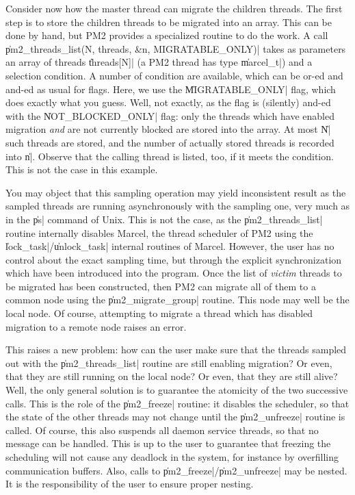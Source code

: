 Consider now how the master thread can migrate the children threads.
The first step is to store the children threads to be migrated into an
array.  This can be done by hand, but PM2 provides a specialized
routine to do the work. A call \|pm2_threads_list(N, threads, &n,
MIGRATABLE_ONLY)| takes as parameters an array of threads
\|threads[N]| (a PM2 thread has type \|marcel_t|) and a selection
condition. A number of condition are available, which can be or-ed and
and-ed as usual for flags. Here, we use the \|MIGRATABLE_ONLY| flag,
which does exactly what you guess. Well, not exactly, as the flag is
(silently) and-ed with the \|NOT_BLOCKED_ONLY| flag: only the threads
which have enabled migration \emph{and} are not currently blocked are
stored into the array. At most \|N| such threads are stored, and the
number of actually stored threads is recorded into \|n|. Observe that
the calling thread is listed, too, if it meets the condition. This is
not the case in this example.

You may object that this sampling operation may yield inconsistent
result as the sampled threads are running asynchronously with the
sampling one, very much as in the \|ps| command of Unix. This is not
the case, as the \|pm2_threads_list| routine internally disables
Marcel, the thread scheduler of PM2 using the
\|lock_task|/\|unlock_task| internal routines of Marcel. However, the
user has no control about the exact sampling time, but through the
explicit synchronization which have been introduced into the program.
Once the list of \emph{victim} threads to be migrated has been
constructed, then PM2 can migrate all of them to a common node using
the \|pm2_migrate_group| routine. This node may well be the local
node.  Of course, attempting to migrate a thread which has disabled
migration to a remote node raises an error.

This raises a new problem: how can the user make sure that the threads
sampled out with the \|pm2_threads_list| routine are still enabling
migration? Or even, that they are still running on the local node? Or
even, that they are still alive? Well, the only general solution is to 
guarantee the atomicity of the two successive calls. This is the role
of the \|pm2_freeze| routine: it disables the scheduler, so that the
state of the other threads may not change until the \|pm2_unfreeze|
routine is called. Of course, this also suspends all daemon service
threads, so that no message can be handled. This is up to the user to
guarantee that freezing the scheduling will not cause any deadlock in
the system, for instance by overfilling communication buffers. Also, 
calls to \|pm2_freeze|/\|pm2_unfreeze| may be nested. It is the
responsibility of the user to ensure proper nesting.

